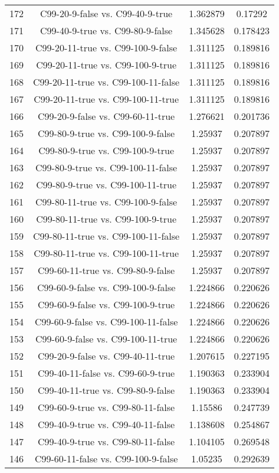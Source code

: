 \documentclass[a4paper,10pt]{article}
\begin{document}
\begin{landscape}
\begin{table}[!htp]
\begin{tabular}{cccc}
172&C99-20-9-false vs. C99-40-9-true&1.362879&0.17292\\
171&C99-40-9-true vs. C99-80-9-false&1.345628&0.178423\\
170&C99-20-11-true vs. C99-100-9-false&1.311125&0.189816\\
169&C99-20-11-true vs. C99-100-9-true&1.311125&0.189816\\
168&C99-20-11-true vs. C99-100-11-false&1.311125&0.189816\\
167&C99-20-11-true vs. C99-100-11-true&1.311125&0.189816\\
166&C99-20-9-false vs. C99-60-11-true&1.276621&0.201736\\
165&C99-80-9-true vs. C99-100-9-false&1.25937&0.207897\\
164&C99-80-9-true vs. C99-100-9-true&1.25937&0.207897\\
163&C99-80-9-true vs. C99-100-11-false&1.25937&0.207897\\
162&C99-80-9-true vs. C99-100-11-true&1.25937&0.207897\\
161&C99-80-11-true vs. C99-100-9-false&1.25937&0.207897\\
160&C99-80-11-true vs. C99-100-9-true&1.25937&0.207897\\
159&C99-80-11-true vs. C99-100-11-false&1.25937&0.207897\\
158&C99-80-11-true vs. C99-100-11-true&1.25937&0.207897\\
157&C99-60-11-true vs. C99-80-9-false&1.25937&0.207897\\
156&C99-60-9-false vs. C99-100-9-false&1.224866&0.220626\\
155&C99-60-9-false vs. C99-100-9-true&1.224866&0.220626\\
154&C99-60-9-false vs. C99-100-11-false&1.224866&0.220626\\
153&C99-60-9-false vs. C99-100-11-true&1.224866&0.220626\\
152&C99-20-9-false vs. C99-40-11-true&1.207615&0.227195\\
151&C99-40-11-false vs. C99-60-9-true&1.190363&0.233904\\
150&C99-40-11-true vs. C99-80-9-false&1.190363&0.233904\\
149&C99-60-9-true vs. C99-80-11-false&1.15586&0.247739\\
148&C99-40-9-true vs. C99-40-11-false&1.138608&0.254867\\
147&C99-40-9-true vs. C99-80-11-false&1.104105&0.269548\\
146&C99-60-11-false vs. C99-100-9-false&1.05235&0.292639\\

\end{tabular}
\end{table}
\end{landscape}
\end{document}
